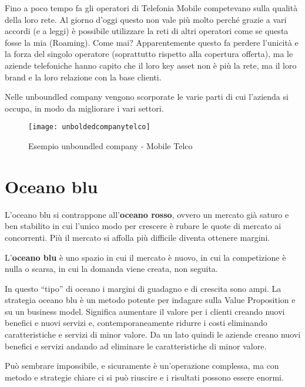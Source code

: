 Fino a poco tempo fa gli operatori di Telefonia Mobile competevano sulla
qualità della loro rete. Al giorno d'oggi questo non vale più molto perché
grazie a vari accordi (e a leggi) è possibile utilizzare la reti di altri
operatori come se questa fosse la mia (Roaming). Come mai? Apparentemente
questo fa perdere l'unicità e la forza del singolo operatore (soprattutto
rispetto alla copertura offerta), ma le aziende telefoniche hanno capito che il
loro key asset non è più la rete, ma il loro brand e la loro relazione con la
base clienti.

Nelle unboundled company vengono scorporate le varie parti di cui l'azienda si
occupa, in modo da migliorare i vari settori.

\begin{figure}[ht]
 \centering
 \texttt{[image: unboldedcompanytelco]}
 \caption{Esempio unboundled company - Mobile Telco}
 \label{fig:bmi:unboldedcompanytelco}
\end{figure}

\section{Oceano blu}

L'oceano blu si contrappone all'\textbf{oceano rosso}, ovvero un mercato già
saturo e ben stabilito in cui l'unico modo per crescere è rubare le quote di
mercato ai concorrenti. Più il mercato si affolla più difficile diventa
ottenere margini.

\begin{definition}
L'\textbf{oceano blu} è uno spazio in cui il mercato è nuovo, in cui la
competizione è nulla o scarsa, in cui la domanda viene creata, non seguita.
\end{definition}

\noindent In questo ``tipo'' di oceano i margini di guadagno e di crescita sono
ampi. La strategia oceano blu è un metodo potente per indagare sulla Value
Proposition e su un business model. Significa aumentare il valore per i clienti
creando nuovi benefici e nuovi servizi e, contemporaneamente ridurre i costi
eliminando caratteristiche e servizi di minor valore.
Da un lato quindi le aziende creano nuovi benefici e servizi andando ad
eliminare le caratteristiche di minor valore.

Può sembrare impossibile, e sicuramente è un'operazione complessa, ma con
metodo e strategie chiare ci si può riuscire e i risultati possono essere
enormi.

